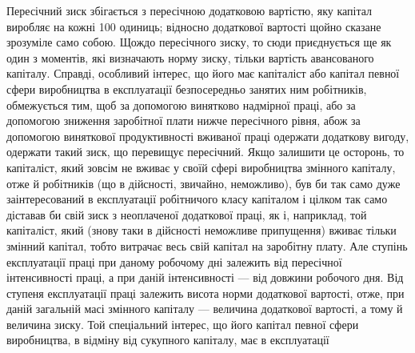 Пересічний зиск збігається з пересічною додатковою вартістю,
яку капітал виробляє на кожні 100 одиниць; відносно додаткової
вартості щойно сказане зрозуміле само собою. Щождо пересічного
зиску, то сюди приєднується ще як один з моментів,
які визначають норму зиску, тільки вартість авансованого капіталу.
Справді, особливий інтерес, що його має капіталіст або
капітал певної сфери виробництва в експлуатації безпосередньо
занятих ним робітників, обмежується тим, щоб за допомогою
винятково надмірної праці, або за допомогою зниження заробітної
плати нижче пересічного рівня, абож за допомогою виняткової
продуктивності вживаної праці одержати додаткову вигоду,
одержати такий зиск, що перевищує пересічний. Якщо залишити
це осторонь, то капіталіст, який зовсім не вживає у своїй сфері
виробництва змінного капіталу, отже й робітників (що в дійсності,
звичайно, неможливо), був би так само дуже заінтересований
в експлуатації робітничого класу капіталом і цілком так само
діставав би свій зиск з неоплаченої додаткової праці, як і, наприклад,
той капіталіст, який (знову таки в дійсності неможливе
припущення) вживає тільки змінний капітал, тобто витрачає весь
свій капітал на заробітну плату. Але ступінь експлуатації праці
при даному робочому дні залежить від пересічної інтенсивності
праці, а при даній інтенсивності — від довжини робочого дня.
Від ступеня експлуатації праці залежить висота норми додаткової
вартості, отже, при даній загальній масі змінного капіталу
— величина додаткової вартості, а тому й величина зиску.
Той спеціальний інтерес, що його капітал певної сфери виробництва,
в відміну від сукупного капіталу, має в експлуатації
\parbreak{}  %
